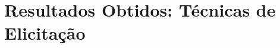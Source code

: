 \chapter[Resultados Obtidos: Técnicas de Elicitação]{Resultados Obtidos: Técnicas de Elicitação}
\label{chap:elicitacao}
	
